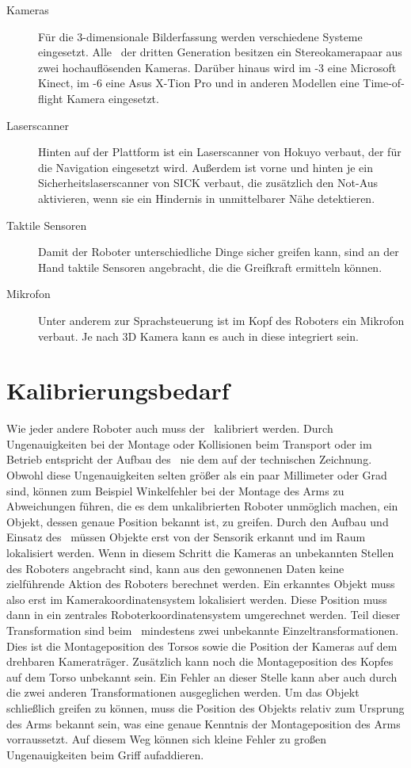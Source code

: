 \begin{description}
  \item[Kameras] Für die 3-dimensionale Bilderfassung werden
    verschiedene Systeme eingesetzt. Alle \cob\ der dritten Generation
    besitzen ein Stereokamerapaar aus zwei hochauflösenden Kameras.
    Darüber hinaus wird im -3 eine Microsoft Kinect, im -6 eine
    Asus X-Tion Pro und in anderen Modellen eine Time-of-flight Kamera
    eingesetzt. 
  \item[Laserscanner] Hinten auf der Plattform ist ein
    Laserscanner von Hokuyo verbaut, der für die Navigation eingesetzt wird.
    Außerdem ist vorne und hinten je ein Sicherheitslaserscanner von SICK
    verbaut, die zusätzlich den Not-Aus aktivieren, wenn sie ein Hindernis in
    unmittelbarer Nähe detektieren. 
  \item[Taktile Sensoren]
    Damit der Roboter unterschiedliche Dinge sicher greifen kann, sind an der
    Hand taktile Sensoren angebracht, die die Greifkraft ermitteln können.
  \item[Mikrofon] Unter anderem zur Sprachsteuerung ist im Kopf des Roboters ein
    Mikrofon verbaut. Je nach 3D Kamera kann es auch in diese integriert sein.\cite{cob_components}
\end{description}


%
%

\section{Kalibrierungsbedarf} %
\label{sec:Kalibrierungsbedarf}
Wie jeder andere Roboter auch muss der \cob\ kalibriert werden. Durch Ungenauigkeiten bei 
der Montage oder Kollisionen beim Transport oder im Betrieb entspricht der Aufbau des \cob\
nie dem auf der technischen Zeichnung. Obwohl diese Ungenauigkeiten selten größer als ein 
paar Millimeter oder Grad sind, können zum Beispiel Winkelfehler bei der Montage des Arms 
zu Abweichungen führen, die es dem unkalibrierten Roboter unmöglich machen, ein Objekt, dessen
genaue Position bekannt ist, zu greifen. Durch den Aufbau und Einsatz des \cob\ müssen 
Objekte erst von der Sensorik erkannt und im Raum lokalisiert werden. Wenn in diesem Schritt 
die Kameras an unbekannten Stellen des Roboters angebracht sind, kann aus den gewonnenen
Daten keine zielführende Aktion des Roboters berechnet werden. Ein erkanntes Objekt muss also 
erst im Kamerakoordinatensystem lokalisiert werden. Diese Position muss dann in ein zentrales 
Roboterkoordinatensystem umgerechnet werden. Teil dieser Transformation sind beim \cob\ mindestens
zwei unbekannte Einzeltransformationen. Dies ist die Montageposition des Torsos sowie die 
Position der Kameras auf dem drehbaren Kameraträger. Zusätzlich kann noch die Montageposition
des Kopfes auf dem Torso unbekannt sein. Ein Fehler an dieser Stelle kann aber auch durch die
zwei anderen Transformationen ausgeglichen werden. Um das Objekt schließlich greifen zu können,
muss die Position des Objekts relativ zum Ursprung des Arms bekannt sein, was eine genaue
Kenntnis der Montageposition des Arms vorraussetzt. Auf diesem Weg können sich kleine Fehler
zu großen Ungenauigkeiten beim Griff aufaddieren.\cite{Haug2012}

